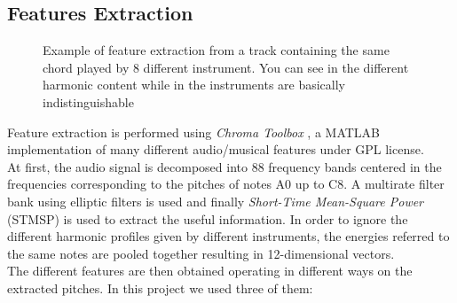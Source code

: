 \subsection{Features Extraction}
\label{subsec:features}
%
\begin{figure}[t]
	\hfill
	\hfill
	\hfill
	\vspace{-5mm}
	\caption{Example of feature extraction from a track containing the same chord played by 8 different instrument. You can see in  the different harmonic content while in  the instruments are basically indistinguishable}
	\label{fig:exampleChromaToolbox}
	\vspace{-5mm}
\end{figure}
%
Feature extraction is performed using \textit{Chroma Toolbox} \cite{ChromaToolbox}, a MATLAB implementation of many different audio/musical features under GPL license.\\
%
At first, the audio signal is decomposed into 88 frequency bands centered in the frequencies corresponding to the pitches of notes A0 up to C8. A multirate filter bank using elliptic filters is used and finally \textit{Short-Time Mean-Square Power} (STMSP) is used to extract the useful information. In order to ignore the different harmonic profiles given by different instruments, the energies referred to the same notes are pooled together resulting in 12-dimensional vectors.\\
%
The different features are then obtained operating in different ways on the extracted pitches. In this project we used three of them:
